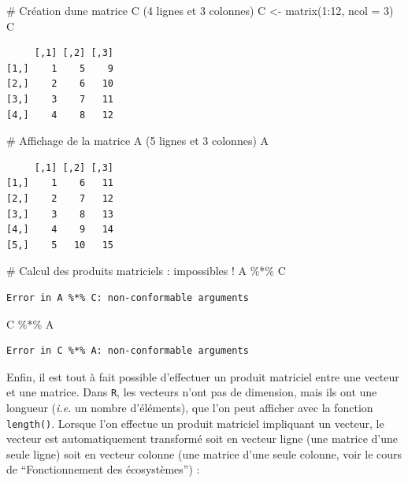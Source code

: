 \documentclass[
  french,
  a4paper,
  DIV=11,
  numbers=noendperiod,
  oneside]{scrreprt}
\newenvironment{Shaded}{}{}
\newcommand{\AttributeTok}[1]{\textcolor[rgb]{0.84,0.23,0.29}{#1}}
\newcommand{\CommentTok}[1]{\textcolor[rgb]{0.42,0.45,0.49}{#1}}
\newcommand{\DecValTok}[1]{\textcolor[rgb]{0.00,0.36,0.77}{#1}}
\newcommand{\FunctionTok}[1]{\textcolor[rgb]{0.44,0.26,0.76}{#1}}
\newcommand{\NormalTok}[1]{\textcolor[rgb]{0.14,0.16,0.18}{#1}}
\newcommand{\OtherTok}[1]{\textcolor[rgb]{0.44,0.26,0.76}{#1}}
\newcommand{\SpecialCharTok}[1]{\textcolor[rgb]{0.00,0.36,0.77}{#1}}
\begin{document}
\begin{tcolorbox}
\begin{Shaded}
\begin{Highlighting}[]
\CommentTok{\# Création d\textquotesingle{}une matrice C (4 lignes et 3 colonnes)}
\NormalTok{C }\OtherTok{\textless{}{-}} \FunctionTok{matrix}\NormalTok{(}\DecValTok{1}\SpecialCharTok{:}\DecValTok{12}\NormalTok{, }\AttributeTok{ncol =} \DecValTok{3}\NormalTok{)}
\NormalTok{C}
\end{Highlighting}
\end{Shaded}

\begin{verbatim}
     [,1] [,2] [,3]
[1,]    1    5    9
[2,]    2    6   10
[3,]    3    7   11
[4,]    4    8   12
\end{verbatim}

\begin{Shaded}
\begin{Highlighting}[]
\CommentTok{\# Affichage de la matrice A (5 lignes et 3 colonnes)}
\NormalTok{A}
\end{Highlighting}
\end{Shaded}

\begin{verbatim}
     [,1] [,2] [,3]
[1,]    1    6   11
[2,]    2    7   12
[3,]    3    8   13
[4,]    4    9   14
[5,]    5   10   15
\end{verbatim}

\begin{Shaded}
\begin{Highlighting}[]
\CommentTok{\# Calcul des produits matriciels : impossibles !}
\NormalTok{A }\SpecialCharTok{\%*\%}\NormalTok{ C}
\end{Highlighting}
\end{Shaded}

\begin{verbatim}
Error in A %*% C: non-conformable arguments
\end{verbatim}

\begin{Shaded}
\begin{Highlighting}[]
\NormalTok{C }\SpecialCharTok{\%*\%}\NormalTok{ A}
\end{Highlighting}
\end{Shaded}

\begin{verbatim}
Error in C %*% A: non-conformable arguments
\end{verbatim}

Enfin, il est tout à fait possible d'effectuer un produit matriciel
entre une vecteur et une matrice. Dans \texttt{R}, les vecteurs n'ont
pas de dimension, mais ils ont une longueur (\emph{i.e.} un nombre
d'éléments), que l'on peut afficher avec la fonction \texttt{length()}.
Lorsque l'on effectue un produit matriciel impliquant un vecteur, le
vecteur est automatiquement transformé soit en vecteur ligne (une
matrice d'une seule ligne) soit en vecteur colonne (une matrice d'une
seule colonne, voir le cours de ``Fonctionnement des écosystèmes'') :


\end{tcolorbox}
\end{document}
